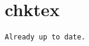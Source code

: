 \appendix
\section{chktex}
\begin{tiny}
\begin{verbatim}
Already up to date.
\end{verbatim}
\end{tiny}
